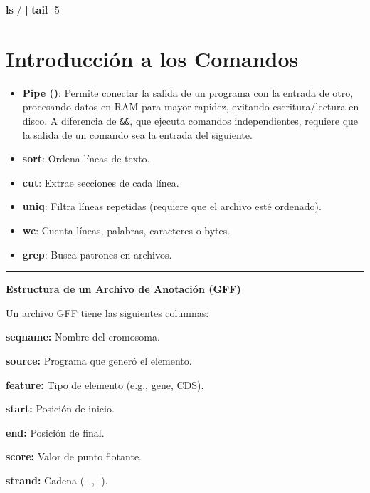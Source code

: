 \documentclass[
]{book}
\newenvironment{Shaded}{\begin{snugshade}}{\end{snugshade}}
\newcommand{\AttributeTok}[1]{\textcolor[rgb]{0.13,0.29,0.53}{#1}}
\newcommand{\FunctionTok}[1]{\textcolor[rgb]{0.13,0.29,0.53}{\textbf{#1}}}
\newcommand{\KeywordTok}[1]{\textcolor[rgb]{0.13,0.29,0.53}{\textbf{#1}}}
\newcommand{\NormalTok}[1]{#1}
\begin{document}
\begin{Shaded}
\begin{Highlighting}[]
\FunctionTok{ls}\NormalTok{ / }\KeywordTok{|} \FunctionTok{tail} \AttributeTok{{-}5}
\end{Highlighting}
\end{Shaded}

\section{Introducción a los Comandos}\label{introducciuxf3n-a-los-comandos}

\begin{itemize}
\item
  \textbf{Pipe (\texttt{\textbar{}})}: Permite conectar la salida de un programa con la entrada de otro, procesando datos en RAM para mayor rapidez, evitando escritura/lectura en disco. A diferencia de \texttt{\&\&}, que ejecuta comandos independientes, \texttt{\textbar{}} requiere que la salida de un comando sea la entrada del siguiente.
\item
  \textbf{sort}: Ordena líneas de texto.
\item
  \textbf{cut}: Extrae secciones de cada línea.
\item
  \textbf{uniq}: Filtra líneas repetidas (requiere que el archivo esté ordenado).
\item
  \textbf{wc}: Cuenta líneas, palabras, caracteres o bytes.
\item
  \textbf{grep}: Busca patrones en archivos.
\end{itemize}

\begin{center}\rule{0.5\linewidth}{0.5pt}\end{center}

\textbf{Estructura de un Archivo de Anotación (GFF)}

Un archivo GFF tiene las siguientes columnas:

\textbf{seqname:} Nombre del cromosoma.

\textbf{source:} Programa que generó el elemento.

\textbf{feature:} Tipo de elemento (e.g., gene, CDS).

\textbf{start:} Posición de inicio.

\textbf{end:} Posición de final.

\textbf{score:} Valor de punto flotante.

\textbf{strand:} Cadena (+, -).
\end{document}
